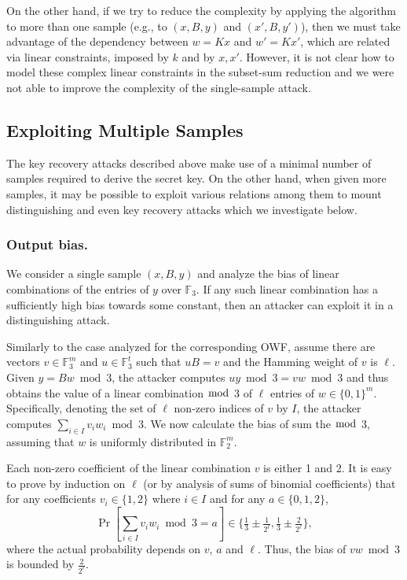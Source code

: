 \documentclass[orivec,envcountsect]{llncs}
\begin{document}
On the other hand, if we try to reduce the complexity by applying the algorithm to more than one sample (e.g., to $(x,B,y)$ and $(x',B,y')$), then we must take advantage of the dependency between $w = K x$ and $w' = K x'$, which are related via linear constraints, imposed by $k$ and by $x,x'$. However, it is not clear how to model these complex linear constraints in the subset-sum reduction and we were not able to improve the complexity of the single-sample attack.

\subsection{Exploiting Multiple Samples}
The key recovery attacks described above make use of a minimal number of samples required to derive the secret key. On the other hand, when given more samples, it may be possible to exploit various relations among them to mount distinguishing and even key recovery attacks which we investigate below.

\subsubsection{Output bias.}
We consider a single sample $(x,B,y)$ and analyze the bias of linear combinations of the entries of $y$ over $\mathbb{F}_3$.
If any such linear combination has a sufficiently high bias towards some constant, 
then an attacker can exploit it in a distinguishing attack.

Similarly to the case analyzed for the corresponding OWF, assume there are vectors $v \in \mathbb{F}_3^m$ and $u \in \mathbb{F}_3^t$ such that $u B = v$ and the Hamming weight of $v$ is $\ell$. Given $y = Bw \bmod 3$, the attacker computes $uy \bmod 3 = vw \bmod 3$ and thus obtains the value of a linear combination $\bmod$ 3 of $\ell$ entries of $w \in \{0,1\}^m$.
Specifically, denoting the set of $\ell$ non-zero indices of $v$ by $I$, the attacker computes $\sum_{i \in I} v_i w_i \bmod 3$.
We now calculate the bias of sum the $\bmod $ 3, assuming that $w$ is uniformly distributed in $\mathbb{F}_2^m$.

Each non-zero coefficient of the linear combination $v$ is either 1 and 2.
It is easy to prove by induction on $\ell$ (or by analysis of sums of binomial coefficients) that
for any coefficients $v_i \in \{1,2\}$ where $i \in I$ and for any $a \in \{0,1,2\}$,
$$\Pr\left[\sum_{i \in I} v_i w_i \bmod 3 = a\right] \in \{\tfrac{1}{3} \pm \tfrac{1}{2^\ell}, \tfrac{1}{3} \pm \tfrac{2}{2^\ell}\},$$
where the actual probability depends on $v$, $a$ and $\ell$. Thus, the bias of $vw \bmod 3$ is bounded by $\tfrac{2}{2^\ell}$.
\end{document}
